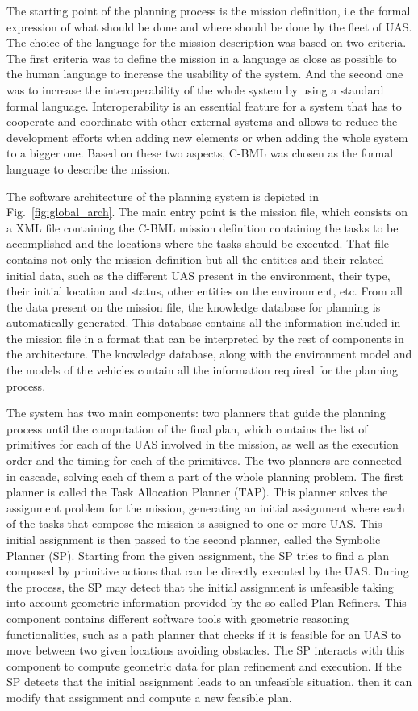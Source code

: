 \documentclass[twocolumn]{svjour3}          %
\begin{document}
The starting point of the planning process is the mission definition, i.e the formal expression of what should be done and where should be done by the fleet of UAS. The choice of the language for the mission description was based on two criteria. The first criteria was to define the mission in a language as close as possible to the human language to increase the usability of the system. And the second one was to increase the interoperability of the whole system by using a standard formal language. Interoperability is an essential feature for a system that has to cooperate and coordinate with other external systems and allows to reduce the development efforts when adding new elements or when adding the whole system to a bigger one. Based on these two aspects, C-BML was chosen as the formal language to describe the mission. 

The software architecture of the planning system is depicted in Fig.~\ref{fig:global_arch}. The main entry point is the mission file, which consists on a XML file containing the C-BML mission definition containing the tasks to be accomplished and the locations where the tasks should be executed. That file contains not only the mission definition but all the entities and their related initial data, such as the different UAS present in the environment, their type, their initial location and status, other entities on the environment, etc. From all the data present on the mission file, the knowledge database for planning is automatically generated. This database contains all the information included in the mission file in a format that can be interpreted by the rest of components in the architecture. The knowledge database, along with the environment model and the models of the vehicles contain all the information required for the planning process.

The system has two main components: two planners that guide the planning process until the computation of the final plan, which contains the list of primitives for each of the UAS involved in the mission, as well as the execution order and the timing for each of the primitives. The two planners are connected in cascade, solving each of them a part of the whole planning problem. The first planner is called the Task Allocation Planner (TAP). This planner solves the assignment problem for the mission, generating an initial assignment where each of the tasks that compose the mission is assigned to one or more UAS. This initial assignment is then passed to the second planner, called the Symbolic Planner (SP). Starting from the given assignment, the SP tries to find a plan composed by primitive actions that can be directly executed by the UAS. During the process, the SP may detect that the initial assignment is unfeasible taking into account geometric information provided by the so-called Plan Refiners. This component contains different software tools with geometric reasoning functionalities, such as a path planner that checks if it is feasible for an UAS to move between two given locations avoiding obstacles. The SP interacts with this component to compute geometric data for plan refinement and execution. If the SP detects that the initial assignment leads to an unfeasible situation, then it can modify that assignment and compute a new feasible plan.
 
\end{document}
